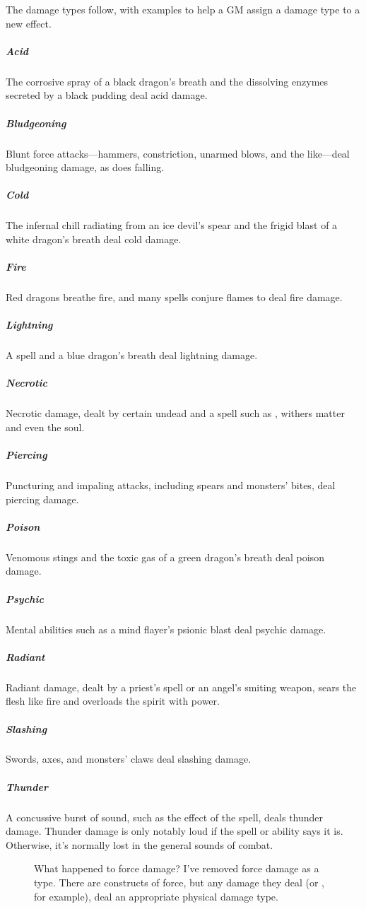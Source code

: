 The damage types follow, with examples to help a GM assign a damage type to a new effect.

\subparagraph*{Acid} The corrosive spray of a black dragon's breath and the dissolving enzymes secreted by a black pudding deal acid damage.

\subparagraph*{Bludgeoning} Blunt force attacks—hammers, constriction, unarmed blows, and the like—deal bludgeoning damage, as does falling.

\subparagraph*{Cold} The infernal chill radiating from an ice devil's spear and the frigid blast of a white dragon's breath deal cold damage.

\subparagraph*{Fire} Red dragons breathe fire, and many spells conjure flames to deal fire damage.

\subparagraph*{Lightning} A  spell and a blue dragon's breath deal lightning damage.

\subparagraph*{Necrotic} Necrotic damage, dealt by certain undead and a spell such as , withers matter and even the soul.

\subparagraph*{Piercing} Puncturing and impaling attacks, including spears and monsters' bites, deal piercing damage.

\subparagraph*{Poison} Venomous stings and the toxic gas of a green dragon's breath deal poison damage.

\subparagraph*{Psychic} Mental abilities such as a mind flayer's psionic blast deal psychic damage.

\subparagraph*{Radiant} Radiant damage, dealt by a priest's  spell or an angel's smiting weapon, sears the flesh like fire and overloads the spirit with power.

\subparagraph*{Slashing} Swords, axes, and monsters' claws deal slashing damage.

\subparagraph*{Thunder} A concussive burst of sound, such as the effect of the  spell, deals thunder damage. Thunder damage is only notably loud if the spell or ability says it is. Otherwise, it's normally lost in the general sounds of combat.

\begin{figure}[htb]
    \begin{DndComment}{What happened to force damage?}
        I've removed force damage as a type. There are constructs of force, but any damage they deal (or , for example), deal an appropriate physical damage type.
    \end{DndComment}
\end{figure}

